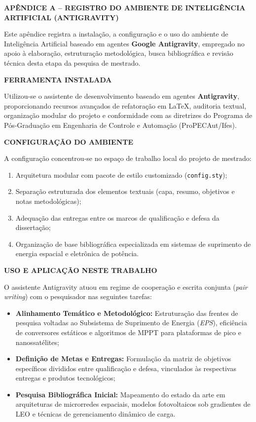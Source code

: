 \newpage
\noindent\textbf{APÊNDICE A -- REGISTRO DO AMBIENTE DE INTELIGÊNCIA ARTIFICIAL (ANTIGRAVITY)}
\vspace{0.5cm}

\noindent Este apêndice registra a instalação, a configuração e o uso do ambiente de Inteligência Artificial baseado em agentes \textbf{Google Antigravity}, empregado no apoio à elaboração, estruturação metodológica, busca bibliográfica e revisão técnica desta etapa da pesquisa de mestrado.

\vspace{0.3cm}
\noindent\textbf{FERRAMENTA INSTALADA}

\noindent Utilizou-se o assistente de desenvolvimento baseado em agentes \textbf{Antigravity}, proporcionando recursos avançados de refatoração em \LaTeX, auditoria textual, organização modular do projeto e conformidade com as diretrizes do Programa de Pós-Graduação em Engenharia de Controle e Automação (ProPECAut/Ifes).

\vspace{0.3cm}
\noindent\textbf{CONFIGURAÇÃO DO AMBIENTE}

\noindent A configuração concentrou-se no espaço de trabalho local do projeto de mestrado:
\begin{enumerate}[label=\alph*)]
    \item Arquitetura modular com pacote de estilo customizado (\texttt{config.sty});
    \item Separação estruturada dos elementos textuais (capa, resumo, objetivos e notas metodológicas);
    \item Adequação das entregas entre os marcos de qualificação e defesa da dissertação;
    \item Organização de base bibliográfica especializada em sistemas de suprimento de energia espacial e eletrônica de potência.
\end{enumerate}

\vspace{0.3cm}
\noindent\textbf{USO E APLICAÇÃO NESTE TRABALHO}

\noindent O assistente Antigravity atuou em regime de cooperação e escrita conjunta (\textit{pair writing}) com o pesquisador nas seguintes tarefas:
\begin{itemize}[leftmargin=*]
    \item \textbf{Alinhamento Temático e Metodológico:} Estruturação das frentes de pesquisa voltadas ao Subsistema de Suprimento de Energia (\textit{EPS}), eficiência de conversores estáticos e algoritmos de MPPT para plataformas de pico e nanossatélites;
    \item \textbf{Definição de Metas e Entregas:} Formulação da matriz de objetivos específicos divididos entre qualificação e defesa, vinculados às respectivas entregas e produtos tecnológicos;
    \item \textbf{Pesquisa Bibliográfica Inicial:} Mapeamento do estado da arte em arquiteturas de microrredes espaciais, modelos fotovoltaicos sob gradientes de LEO e técnicas de gerenciamento dinâmico de carga.
\end{itemize}